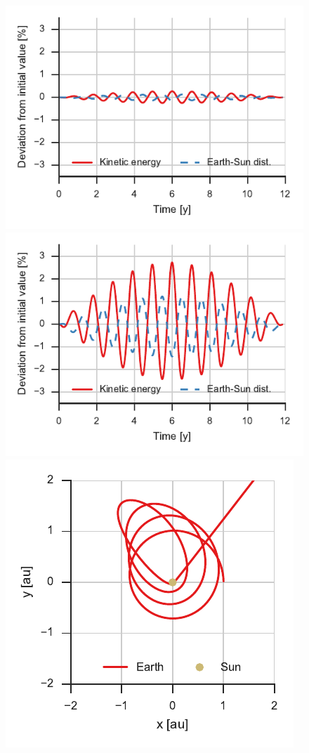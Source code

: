 \documentclass[aps,prc,reprint]{revtex4-1}
\begin{document}
        \begin{figure}
            \includegraphics{jupiter_devs_1x.pdf}
            \includegraphics{jupiter_devs_10x.pdf}
            \includegraphics{jupiter_1000x.pdf}

\end{figure}
\end{document}
